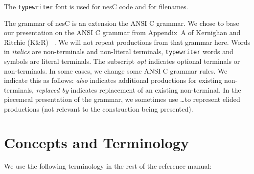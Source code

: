 \documentclass[11pt]{article}
\newcommand{\kw}[1]{{\tt #1}}
\newcommand{\nesc}{nesC\xspace}
\begin{document}
The \texttt{typewriter} font is used for \nesc code and for filenames.

The grammar of \nesc is an extension the ANSI C grammar. We chose to base
our presentation on the ANSI C grammar from Appendix~A of Kernighan and
Ritchie (K\&R) ~\cite[pp234--239]{kandr}. We will not repeat productions
from that grammar here. Words in \emph{italics} are non-terminals and
non-literal terminals, \kw{typewriter} words and symbols are literal
terminals. The subscript \emph{opt} indicates optional terminals or
non-terminals. In some cases, we change some ANSI C grammar rules. We
indicate this as follows: \emph{also} indicates additional productions for
existing non-terminals, \emph{replaced by} indicates replacement of an
existing non-terminal. In the piecemeal presentation of the grammar, we
sometimes use \ldots to represent elided productions (not relevant to the
construction being presented).

\section{Concepts and Terminology}

We use the following terminology in the rest of the reference manual:
\end{document}
